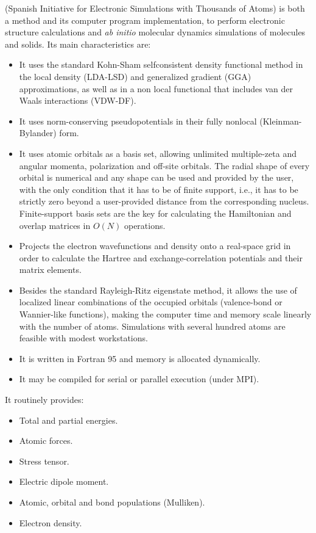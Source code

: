 \siesta{} (Spanish Initiative for
Electronic Simulations with
Thousands of Atoms) is both a method and its computer program implementation,
to perform electronic structure calculations and \textit{ab initio} molecular
dynamics simulations of molecules and solids. Its main characteristics are:
\begin{itemize}
\item
It uses the standard Kohn-Sham selfconsistent density functional
method in the local density (LDA-LSD) and generalized gradient (GGA)
approximations, as well as in a non local functional that includes
van der Waals interactions (VDW-DF).
\item
It uses norm-conserving pseudopotentials in their fully nonlocal
(Kleinman-Bylander) form.
\item
It uses atomic orbitals as a basis set, allowing unlimited multiple-zeta
and angular momenta, polarization and off-site orbitals. The radial
shape of every orbital is numerical and any shape can be used and provided
by the user, with the only condition that it has to be of finite support,
i.e., it has to be strictly zero beyond a user-provided distance from the
corresponding nucleus.
Finite-support basis sets are the key for calculating the Hamiltonian
and overlap matrices in $O(N)$ operations.
\item
Projects the electron wavefunctions and density onto a real-space
grid in order to calculate the Hartree and exchange-correlation
potentials and their matrix elements.
\item
Besides the standard Rayleigh-Ritz eigenstate method, it allows
the use of localized linear combinations of the occupied orbitals
(valence-bond or Wannier-like functions), making the computer
time and memory scale linearly with the number of atoms.
Simulations with several hundred atoms are feasible with
modest workstations.
\item
It is written in Fortran 95 and memory is allocated dynamically.
\item
It may be compiled for serial or parallel execution (under MPI).

\end{itemize}

It routinely provides:
\begin{itemize}
\item Total and partial energies.
\item Atomic forces.
\item Stress tensor.
\item Electric dipole moment.
\item Atomic, orbital and bond populations (Mulliken).
\item Electron density.
\end{itemize}

